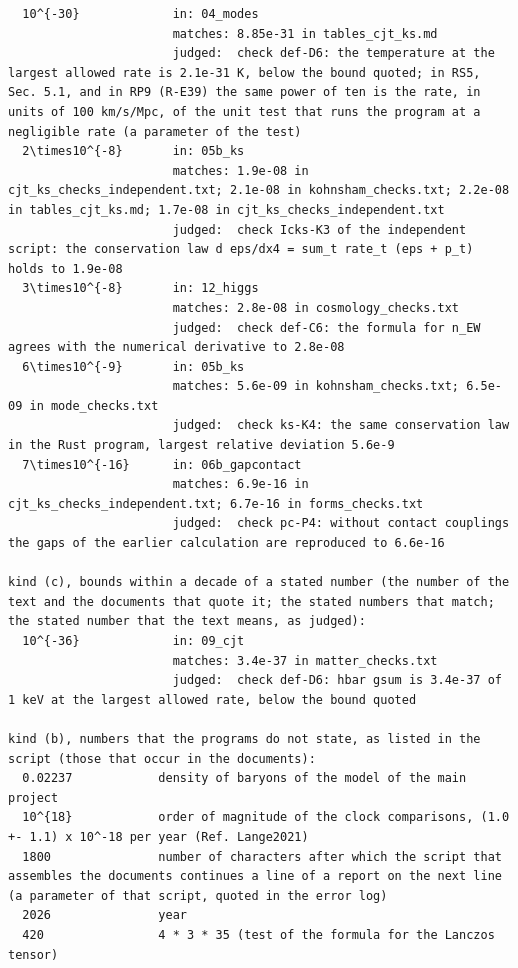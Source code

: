 \documentclass[
  10pt,
]{article}
\begin{document}
\begin{verbatim}
  10^{-30}             in: 04_modes
                       matches: 8.85e-31 in tables_cjt_ks.md
                       judged:  check def-D6: the temperature at the largest allowed rate is 2.1e-31 K, below the bound quoted; in RS5, Sec. 5.1, and in RP9 (R-E39) the same power of ten is the rate, in units of 100 km/s/Mpc, of the unit test that runs the program at a negligible rate (a parameter of the test)
  2\times10^{-8}       in: 05b_ks
                       matches: 1.9e-08 in cjt_ks_checks_independent.txt; 2.1e-08 in kohnsham_checks.txt; 2.2e-08 in tables_cjt_ks.md; 1.7e-08 in cjt_ks_checks_independent.txt
                       judged:  check Icks-K3 of the independent script: the conservation law d eps/dx4 = sum_t rate_t (eps + p_t) holds to 1.9e-08
  3\times10^{-8}       in: 12_higgs
                       matches: 2.8e-08 in cosmology_checks.txt
                       judged:  check def-C6: the formula for n_EW agrees with the numerical derivative to 2.8e-08
  6\times10^{-9}       in: 05b_ks
                       matches: 5.6e-09 in kohnsham_checks.txt; 6.5e-09 in mode_checks.txt
                       judged:  check ks-K4: the same conservation law in the Rust program, largest relative deviation 5.6e-9
  7\times10^{-16}      in: 06b_gapcontact
                       matches: 6.9e-16 in cjt_ks_checks_independent.txt; 6.7e-16 in forms_checks.txt
                       judged:  check pc-P4: without contact couplings the gaps of the earlier calculation are reproduced to 6.6e-16

kind (c), bounds within a decade of a stated number (the number of the text and the documents that quote it; the stated numbers that match; the stated number that the text means, as judged):
  10^{-36}             in: 09_cjt
                       matches: 3.4e-37 in matter_checks.txt
                       judged:  check def-D6: hbar gsum is 3.4e-37 of 1 keV at the largest allowed rate, below the bound quoted

kind (b), numbers that the programs do not state, as listed in the script (those that occur in the documents):
  0.02237            density of baryons of the model of the main project
  10^{18}            order of magnitude of the clock comparisons, (1.0 +- 1.1) x 10^-18 per year (Ref. Lange2021)
  1800               number of characters after which the script that assembles the documents continues a line of a report on the next line (a parameter of that script, quoted in the error log)
  2026               year
  420                4 * 3 * 35 (test of the formula for the Lanczos tensor)
\end{verbatim}
\end{document}
